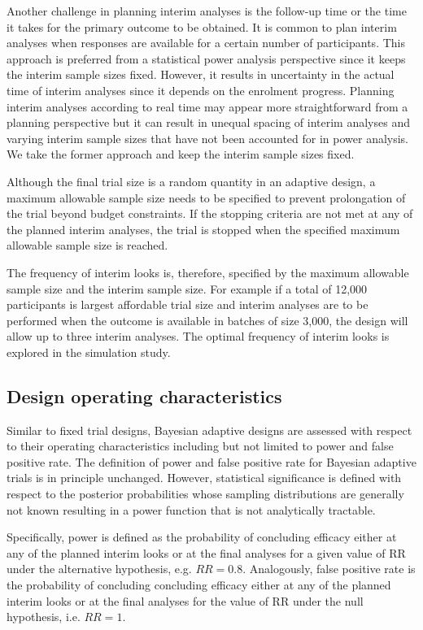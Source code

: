 \documentclass[12pt]{article}
\begin{document}
Another challenge in planning interim analyses is the follow-up time or the time it takes for the primary outcome to be obtained. It is common to plan interim analyses when responses are available for a certain number of participants. This approach is preferred from a statistical power analysis perspective since it keeps the interim sample sizes fixed. However, it results in uncertainty in the actual time of interim analyses since it depends on the enrolment progress. Planning interim analyses according to real time may appear more straightforward from a planning perspective but it can result in unequal spacing of interim analyses and varying interim sample sizes that have not been accounted for in power analysis. We take the former approach and keep the interim sample sizes fixed. 

Although the final trial size is a random quantity in an adaptive design, a maximum allowable sample size needs to be specified to prevent prolongation of the trial beyond budget constraints. If the stopping criteria are not met at any of the planned interim analyses, the trial is stopped when the specified maximum allowable sample size is reached.

The frequency of interim looks is, therefore, specified by the maximum allowable sample size and the interim sample size. For example if a total of 12,000 participants is largest affordable trial size and interim analyses are to be performed when the outcome is available in batches of size 3,000, the design will allow up to three interim analyses. The optimal frequency of interim looks is explored in the simulation study.

\subsection{Design operating characteristics}
\label{doc}
Similar to fixed trial designs, Bayesian adaptive designs are assessed with respect to their operating characteristics including but not limited to power and false positive rate. The definition of power and false positive rate for Bayesian adaptive trials is in principle unchanged. However, statistical significance is defined with respect to the posterior probabilities whose sampling distributions are generally not known resulting in a power function that is not analytically tractable. 

Specifically, power is defined as the probability of concluding efficacy either at any of the planned interim looks or at the final analyses for a given value of RR under the alternative hypothesis, e.g. $RR = 0.8$. Analogously, false positive rate is the probability of concluding concluding efficacy either at any of the planned interim looks or at the final analyses for the value of RR under the null hypothesis, i.e. $RR = 1$.
\end{document}

